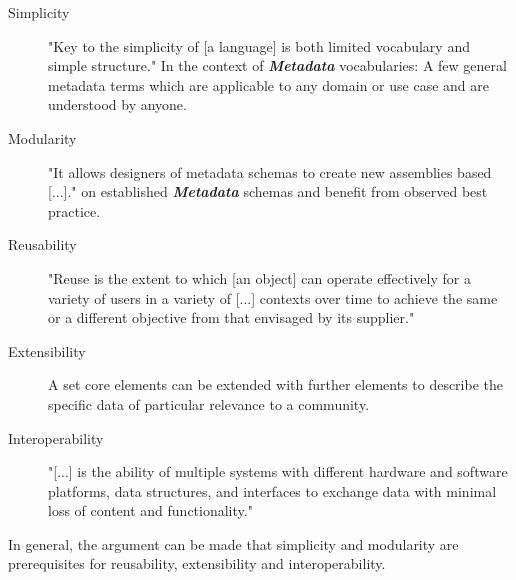 \documentclass[a4paper,english,twoside,BCOR1.5cm,headsepline,DIV12,appendixprefix,final,12pt]{scrbook}
\newcommand{\important}[1]{\textbf{\textit{#1}}}
\begin{document}
\begin{description}
\item[Simplicity] "Key to the simplicity of [a language] is both limited vocabulary and simple structure." \cite{SimplicityComplexity} In the context of \important{Metadata} vocabularies:
A few general metadata terms which are applicable to any domain or use case and are understood by anyone.
\item[Modularity] "It allows designers of metadata schemas to create new assemblies based [...]." \cite{MetadataPrinciples}
on established \important{Metadata} schemas and benefit from observed best practice.
\item[Reusability] "Reuse is the extent to which [an object] can operate effectively for a variety of users in a variety of [...] contexts over time to achieve the same or a different objective from that envisaged by its supplier." \cite{Palmer}
\item[Extensibility] A set core elements can be extended with further elements to describe the specific data of particular relevance to a community.
\item[Interoperability] "[...] is the ability of multiple systems with different hardware and software platforms, data structures, and interfaces to exchange data with minimal loss of content and functionality." \cite{NISO2004}
\end{description}

In general, the argument can be made that simplicity and modularity are prerequisites for reusability, extensibility and interoperability.


\end{document}
